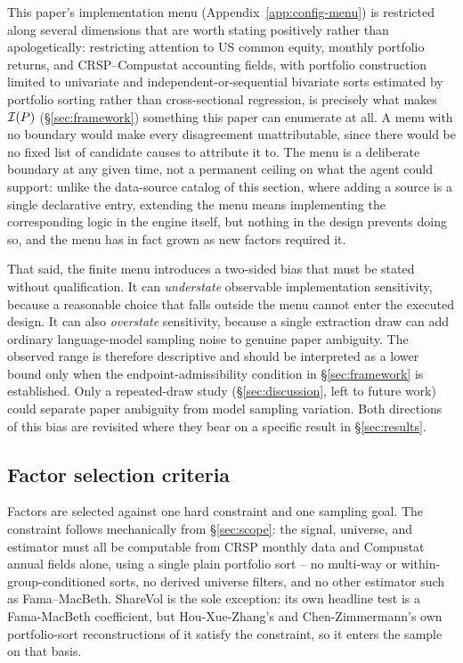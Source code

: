 This paper's implementation menu (Appendix~\ref{app:config-menu}) is
restricted along several dimensions that are worth stating positively
rather than apologetically: restricting attention to US common equity,
monthly portfolio returns, and CRSP--Compustat accounting fields, with
portfolio construction limited to univariate and independent-or-sequential
bivariate sorts estimated by portfolio sorting rather than cross-sectional
regression, is precisely what makes $\mathcal{I}(P)$
(\S\ref{sec:framework}) something this paper can enumerate at all. A menu
with no boundary would make every disagreement unattributable, since there
would be no fixed list of candidate causes to attribute it to. The menu is a
deliberate boundary at any given time, not a permanent ceiling on what the
agent could support: unlike the data-source catalog of this section, where
adding a source is a single declarative entry, extending the menu means
implementing the corresponding logic in the engine itself, but nothing in
the design prevents doing so, and the menu has in fact grown as new factors
required it.


That said, the finite menu introduces a two-sided bias that must be stated
without qualification. It can \emph{understate} observable implementation
sensitivity, because a reasonable choice that falls outside the menu cannot
enter the executed design. It can also \emph{overstate} sensitivity, because
a single extraction draw can add ordinary language-model sampling noise to
genuine paper ambiguity. The observed range is therefore descriptive and
should be interpreted as a lower bound only when the endpoint-admissibility
condition in \S\ref{sec:framework} is established. Only a repeated-draw study
(\S\ref{sec:discussion}, left to future work) could separate paper ambiguity
from model sampling variation. Both directions of this bias are revisited
where they bear on a specific result in \S\ref{sec:results}.

\subsection{Factor selection criteria}
\label{sec:selection}

Factors are selected against one hard constraint and one sampling goal.
The constraint follows mechanically from \S\ref{sec:scope}: the signal,
universe, and estimator must all be computable from CRSP monthly data and
Compustat annual fields alone, using a single plain portfolio sort -- no
multi-way or within-group-conditioned sorts, no derived universe filters,
and no other estimator such as Fama--MacBeth. ShareVol is the sole
exception: its own headline test is a Fama-MacBeth coefficient, but
Hou-Xue-Zhang's and Chen-Zimmermann's own portfolio-sort reconstructions of
it satisfy the constraint, so it enters the sample on that basis.

